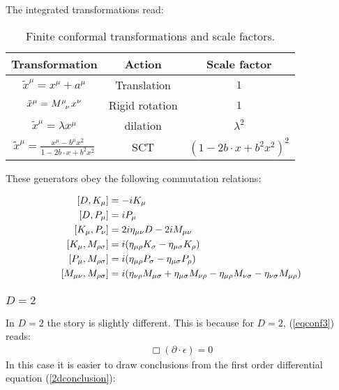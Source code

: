 The integrated transformations read:

\begin{table}[h!]
  \centering
  \caption{Finite conformal transformations and scale factors.}
  \label{ch2:table2}
  \begin{tabular}{ccc}
    \toprule
    Transformation & Action & Scale factor\\
    \midrule
    $\tilde{x}^\mu = x^\mu +a^\mu $ & Translation & $1$\\
    $\tilde{x}^\mu = \tensor[]{M}{^\mu_\nu}x^\nu$ & Rigid rotation & $1$\\
    $\tilde{x}^\mu = \lambda x^\mu$ & dilation & $ \lambda^2$\\
    $\tilde{x}^\mu = \frac{x^\mu -b^\mu x^2}{1-2b\cdot x +b^2 x^2}$ & SCT & $(1-2b\cdot x +b^2 x^2)^2$
  \end{tabular}
\end{table}


  These generators obey the following commutation relations:
  
  \begin{align*}
  \centering %
  [D,K_{\mu}] &= -iK_{\mu} \\
  [D,P_{\mu}] &= iP_{\mu} \\
  [K_{\mu},P_\nu] &= 2i\eta_{\mu\nu} D - 2iM_{\mu\nu} \\
  [K_\mu,M_{\rho\sigma}] &= i(\eta_{\mu\rho}K_\sigma - \eta_{\mu\sigma}K_{\rho}) \\
  [P_\mu, M_{\rho\sigma}] &= i(\eta_{\mu\rho}P_\sigma - \eta_{\mu\sigma}P_{\rho}) \\
   [M_{\mu\nu},M_{\rho\sigma}] &= i(\eta_{\nu\rho}M_{\mu\sigma}+\eta_{\mu\sigma}M_{\nu\rho}-\eta_{\mu\rho}M_{\nu\sigma}-\eta_{\nu\sigma}M_{\mu\rho})
  \end{align*}
  
  \subsubsection{\underline{$D = 2$}}
  In $D=2$ the story is slightly different. This is because for $D=2$, (\ref{eqconf3}) reads:
  \begin{align}
   \Box (\partial \cdot \epsilon ) = 0
  \end{align}
  In this case it is easier to draw conclusions from the first order differential equation (\ref{2dconclusion}):
  
